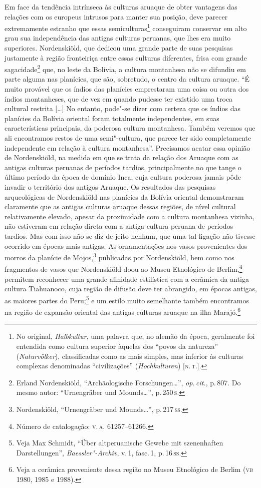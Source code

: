 Em face da tendência intrínseca às culturas aruaque de obter vantagens
das relações com os europeus intrusos para manter sua posição, deve
parecer extremamente estranho que essas semiculturas\footnote{No original,
  \textit{Halbkultur}, uma palavra que, no alemão da época, geralmente
  foi entendida como cultura superior àquelas dos ``povos da natureza''
  (\textit{Naturvölker}), classificadas como as mais simples, mas inferior
  às culturas complexas denominadas ``civilizações'' (\textit{Hochkulturen})
  {[}\textsc{n.\,t.}{]}.} conseguiram
conservar em alto grau sua independência das antigas culturas peruanas,
que lhes era muito superiores. Nordenskiöld, que dedicou uma grande
parte de suas pesquisas justamente à região fronteiriça entre essas
culturas diferentes, frisa com grande sagacidade\footnote{Erland Nordenskiöld, ``Archäologische Forschungen\ldots'', \textit{op.\,cit.}, p.\,807.
  Do mesmo autor: ``Urnengräber und Mounds\ldots'', p.\,250\,\textsc{s}.} que, no leste da Bolívia, a cultura
montanhesa não se difundiu em parte alguma nas planícies, que são,
sobretudo, o centro da cultura aruaque. ``É muito provável que os índios
das planícies emprestaram uma coisa ou outra dos índios montanheses,
que de vez em quando pudesse ter existido uma troca cultural restrita
{[}\ldots{}{]} No entanto, pode"-se dizer com certeza que os índios das
planícies da Bolívia oriental foram totalmente independentes, em suas
características principais, da poderosa cultura montanhesa. Também
veremos que ali encontramos restos de uma semi"-cultura, que parece ter
sido completamente independente em relação à cultura montanhesa''.
Precisamos acatar essa opinião de Nordenskiöld, na medida em que se
trata da relação dos Aruaque com as antigas culturas peruanas de
períodos tardios, principalmente no que tange o último período da época
de domínio Inca, cuja cultura poderosa jamais pôde invadir o território
dos antigos Aruaque. Os resultados das pesquisas arqueológicas de
Nordenskiöld nas planícies da Bolívia oriental demonstraram claramente
que as antigas culturas aruaque dessas regiões, de nível cultural
relativamente elevado, apesar da proximidade com a cultura montanhesa
vizinha, não estiveram em relação direta com a antiga cultura peruana de
períodos tardios. Mas com isso não se diz de jeito nenhum, que uma tal
ligação não tivesse ocorrido em épocas mais antigas. As ornamentações
nos vasos provenientes dos morros da planície de Mojos,\footnote{Nordenskiöld,
  ``Urnengräber und Mounds\ldots'', p.\,217\,\textsc{ss}.} 
  publicadas por Nordenskiöld, bem como nos fragmentos de
vasos que Nordenskiöld doou ao Museu Etnológico de Berlim,\footnote{Número
  de catalogação: \textsc{v.\,a.} 61257--61266.} permitem reconhecer uma grande
afinidade estilística com a cerâmica da antiga cultura Tiahuanoco, cuja
região de difusão deve ter abrangido, em épocas antigas, as maiores
partes do Peru;\footnote{Veja Max Schmidt, ``Über altperuanische Gewebe
  mit szenenhaften Darstellungen'', \textit{Baessler"-Archiv}, v.\,1, fasc.\,1, p.\,16\,\textsc{ss}.} e um estilo muito semelhante também encontramos na
região de expansão oriental das antigas culturas aruaque na ilha
Marajó.\footnote{Veja a cerâmica proveniente dessa região no Museu
  Etnológico de Berlim (\textsc{vb} 1980, 1985 e 1988).}

